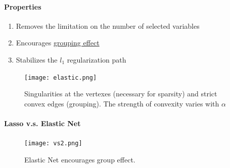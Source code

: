 \documentclass[11pt]{article}
\newcommand{\under}[1]{\underline{#1}}
\begin{document}
 \paragraph{Properties}
 \begin{enumerate}
 	\item Removes the limitation on the number of selected variables
 	\item Encourages \under{grouping effect}
 	\item Stabilizes the $l_1$ regularization path
 \end{enumerate}
\begin{figure}[h]
	\centering
	\texttt{[image: elastic.png]}
	\caption{Singularities at the vertexes (necessary for sparsity) and strict convex edges (grouping). The strength of convexity varies with $\alpha$}
\end{figure}
\paragraph{Lasso v.s. Elastic Net}

 \begin{figure}[h]
	\centering
	\texttt{[image: vs2.png]}
	\caption{Elastic Net encourages group effect.}
\end{figure}
 
 
 
 
\end{document}
